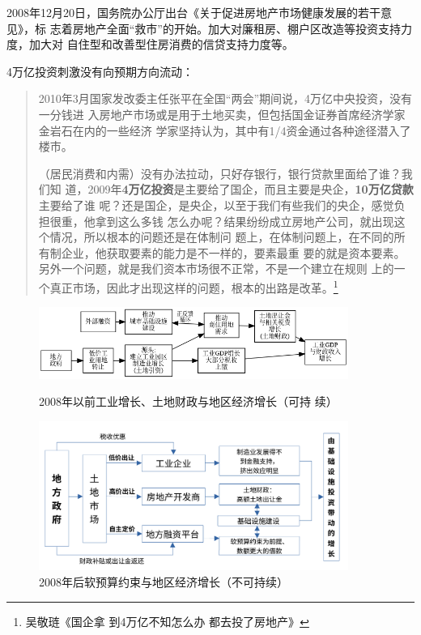 2008年12月20日，国务院办公厅出台《关于促进房地产市场健康发展的若干意见》，标
志着房地产全面“救市”的开始。加大对廉租房、棚户区改造等投资支持力度，加大对
自住型和改善型住房消费的信贷支持力度等。

4万亿投资刺激没有向预期方向流动：
\begin{quotation}
2010年3月国家发改委主任张平在全国“两会”期间说，4万亿中央投资，没有一分钱进
入房地产市场或是用于土地买卖，但包括国金证券首席经济学家金岩石在内的一些经济
学家坚持认为，其中有1/4资金通过各种途径潜入了楼市。\cite{2011feiteng}

（居民消费和内需）没有办法拉动，只好存银行，银行贷款里面给了谁？我们知
道，2009年\textbf{4万亿投资}是主要给了国企，而且主要是央企，\textbf{10万亿贷款}主要给了谁
呢？还是国企，是央企，以至于我们有些我们的央企，感觉负担很重，他拿到这么多钱
怎么办呢？结果纷纷成立房地产公司，就出现这个情况，所以根本的问题还是在体制问
题上，在体制问题上，在不同的所有制企业，他获取要素的能力是不一样的，要素最重
要的就是资本要素。另外一个问题，就是我们资本市场很不正常，不是一个建立在规则
上的一个真正市场，因此才出现这样的问题，根本的出路是改革。\footnote{吴敬琏《国企拿
  到4万亿不知怎么办 都去投了房地产》}
\end{quotation}

\begin{figure}[htbp!]
  \centering
  \includegraphics[width=0.9\textwidth]{figures/before08.png}
  \caption{\label{fig:bf08}2008年以前工业增长、土地财政与地区经济增长（可持
    续） }

  \includegraphics[width=0.9\textwidth]{figures/after08}
  \caption{\label{fig:af08}2008年后软预算约束与地区经济增长（不可持续） }
\end{figure}

